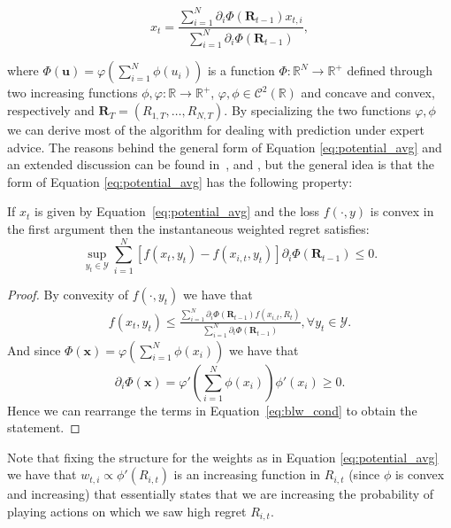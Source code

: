 \begin{equation}\label{eq:potential_avg}
x_t = \frac{\sum\limits_{i=1}^{N}\partial_i \Phi(\mathbf R_{t-1}) x_{t,i}}{\sum\limits_{i=1}^{N}\partial_i \Phi(\mathbf R_{t-1}) },
\end{equation}

where $\Phi(\mathbf u)=\varphi\left(\sum\limits_{i=1}^N\phi(u_i)\right)$ is a function $\Phi:\mathbb R^N\to\mathbb R^+$ defined through two increasing functions $\phi,\varphi:\mathbb R\to\mathbb R^+$, $\varphi,\phi\in\mathcal C^2(\mathbb R)$ and concave and convex, respectively and $\mathbf R_T=(R_{1,T},\ldots,R_{N,T})$.
By specializing the two functions $\varphi,\phi$ we can derive most of the algorithm for dealing with prediction under expert advice.
The reasons behind the general form of Equation \eqref{eq:potential_avg} and an extended discussion can be found in~\cite{hart2001general}, \cite{cesa2003potential} and \cite{blackwell1956analog}, but the general idea is that the form of Equation \eqref{eq:potential_avg} has the following property:

\begin{theorem}\cite{cesa2003potential}
	If $x_t$ is given by Equation~\eqref{eq:potential_avg} and the loss $f(\cdot,y)$ is convex in the first argument then the instantaneous weighted regret satisfies:  
	$$\sup\limits_{y_t\in\mathcal Y}\sum\limits_{i=1}^N[f(x_t,y_t)-f(x_{i,t},y_t)]\partial_i \Phi(\mathbf R_{t-1}) \le 0.$$
\end{theorem}

\begin{proof}
	By convexity of $f(\cdot,y_t)$ we have that 
\begin{align}\label{eq:blw_cond}
	f(x_t,y_t)\le\frac{\sum\limits_{i=1}^N\partial_i\Phi(\mathbf R_{t-1})f(x_{i,t},R_t)}{\sum\limits_{i=1}^N\partial_i\Phi(\mathbf R_{t-1})}, \forall y_t\in\mathcal Y.
\end{align}
And since $\Phi(\mathbf x)=\varphi\left(\sum\limits_{i=1}^N \phi(x_i)\right)$ we have that $$\partial_i\Phi(\mathbf x)=\varphi'\left(\sum\limits_{i=1}^N\phi(x_i)\right)\phi'(x_i)\ge0.$$
Hence we can rearrange the terms in Equation~\eqref{eq:blw_cond} to obtain the statement.
\end{proof}

Note that fixing the structure for the weights as in Equation \eqref{eq:potential_avg} we have that $w_{t,i}\propto\phi'(R_{i,t})$ is an increasing function in $R_{i,t}$ (since $\phi$ is convex and increasing) that essentially states that we are increasing the probability of playing actions on which we saw high regret $R_{i,t}$.

